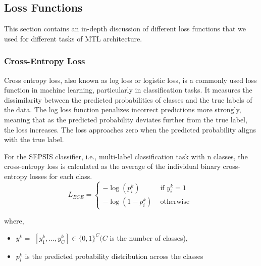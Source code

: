  



\subsection{Loss Functions}\label{sec:MTL_loss_function}
This section contains an in-depth discussion of different loss functions that we used for different tasks of MTL architecture.

\subsubsection{Cross-Entropy Loss}
Cross entropy loss, also known as log loss or logistic loss, is a commonly used loss function in machine learning, particularly in classification tasks. It measures the dissimilarity between the predicted probabilities of classes and the true labels of the data. The log loss function penalizes incorrect predictions more strongly, meaning that as the predicted probability deviates further from the true label, the loss increases. The loss approaches zero when the predicted probability aligns with the true label.

For the SEPSIS classifier, i.e., multi-label classification task with n classes, the cross-entropy loss is calculated as the average of the individual binary cross-entropy losses for each class. 
\begin{equation}
L_{B C E}= \begin{cases}-\log \left(p_i^k\right) & \text { if } y_i^k=1 \\ -\log \left(1-p_i^k\right) & \text { otherwise }\end{cases}
\end{equation}

where,
\begin{itemize}
\item $y^k=$ $\left[y_1^k, \ldots, y_C^k\right] \in\{0,1\}^C(C$ is the number of classes),
\item{$p_i^k$ is the predicted probability distribution across the classes}
\end{itemize}


